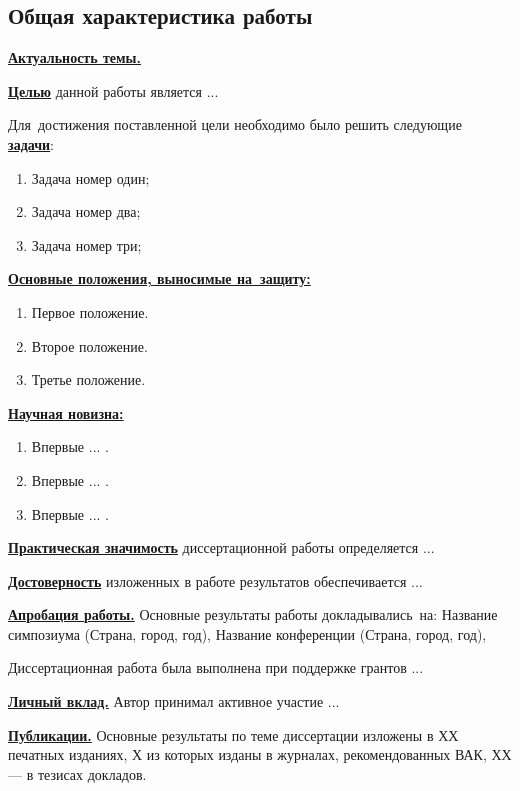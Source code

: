 \subsection*{\Large Общая характеристика работы}
\fontsize{14pt}{15pt}\selectfont
\underline{\textbf{Актуальность темы.}}

\underline{\textbf{Целью}} данной работы является ...

Для~достижения поставленной цели необходимо было решить следующие \underline{\textbf{задачи}}:
\begin{enumerate}
 \item Задача номер один;
 \item Задача номер два;
 \item Задача номер три;
\end{enumerate}

\underline{\textbf{Основные положения, выносимые на~защиту:}}
\begin{enumerate}
 \item Первое положение.
 \item Второе положение.
 \item Третье положение.
\end{enumerate}

\underline{\textbf{Научная новизна:}}
\begin{enumerate}
 \item Впервые ... . 
 \item Впервые ... .
 \item Впервые ... . 
\end{enumerate}

\underline{\textbf{Практическая значимость}} диссертационной работы определяется ...

\underline{\textbf{Достоверность}} изложенных в работе результатов обеспечивается ...

\underline{\textbf{Апробация работы.}}
Основные результаты работы докладывались~на:
Название симпозиума (Страна, город, год),
Название конференции (Страна, город, год),

Диссертационная работа была выполнена при поддержке грантов ...

\underline{\textbf{Личный вклад.}} Автор принимал активное участие ...

\underline{\textbf{Публикации.}} Основные результаты по теме диссертации изложены в ХХ печатных изданиях, Х из которых изданы в журналах, рекомендованных ВАК, ХХ --- в тезисах докладов.

